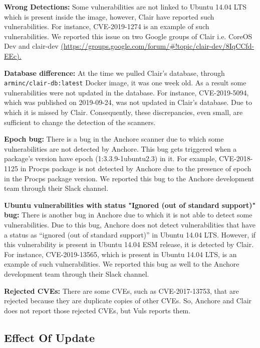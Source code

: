 \documentclass[a4paper,num-refs]{oup-contemporary}
\begin{document}
\textbf{Wrong Detections:} 
Some vulnerabilities are not linked to Ubuntu 14.04 LTS which is 
present inside the image, however, Clair have reported such vulnerabilities.
For instance, CVE-2019-1274 is an example of such vulnerabilities. 
We reported this issue on two Google groups of Clair i.e. CoreOS Dev and
clair-dev \url{(https://groups.google.com/forum/\#!topic/clair-dev/8IqCCfd-EEc).}

\textbf{Database difference:} At the time we pulled Clair's database, through \texttt{arminc/clair-db:latest} Docker image, it was one week old.
                              As a result some vulnerabilities were not updated in the database. For instance, CVE-2019-5094, which
		              was published on 2019-09-24, was not 
		              updated in Clair's database. Due to which it is missed by Clair.
			      Consequently, these discrepancies, even small, are sufficient to change the detection of
			      the scanners.

\textbf{Epoch bug:} There is a bug in the Anchore scanner due to which some vulnerabilities are 
		not detected by Anchore. This bug gets triggered when a package’s version have epoch 
		(1:3.3.9-1ubuntu2.3) in it. For example, CVE-2018-1125 in Procps package is not
		detected by Anchore due to the presence of epoch in the Procps package version.
		We reported this bug to the Anchore development team through their Slack channel.

\textbf{Ubuntu vulnerabilities with status "Ignored (out of standard support)" bug:} There is another bug in Anchore due to 
		which it is not able to detect some vulnerabilities. Due to this bug, Anchore does not detect 
		vulnerabilities that have a status as “ignored (out of standard support)” in Ubuntu 14.04 LTS. 
		However, if this vulnerability is present in Ubuntu 14.04 ESM release, it is detected by Clair. 
		For instance, CVE-2019-13565, which is present in Ubuntu 14.04 LTS, is an example of such vulnerabilities. 
		We reported this bug as well to the Anchore development team through their Slack
		channel.

\textbf{Rejected CVEs:} There are some CVEs, such as CVE-2017-13753, that are rejected because they are duplicate copies of other CVEs. 
	So, Anchore and Clair does not report those rejected CVEs, but Vuls reports them.

\subsection{Effect Of Update}
\end{document}
